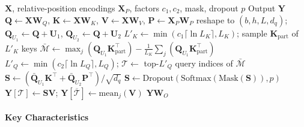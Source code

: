 \begin{algorithm}[H]
\caption{ProbSparse self-attention (training / parallel form)}
\begin{algorithmic}[1]
\Require $\mathbf{X}$, relative-position encodings $\mathbf{X}_P$, factors $c_1,c_2$, mask, dropout $p$
\Ensure Output $\mathbf{Y}$
\State $\mathbf{Q}\gets\mathbf{X}\mathbf{W}_Q$, $\mathbf{K}\gets\mathbf{X}\mathbf{W}_K$, $\mathbf{V}\gets\mathbf{X}\mathbf{W}_V$, $\mathbf{P}\gets\mathbf{X}_P\mathbf{W}_P$
\State reshape to $(b,h,L,d_q)$; $\mathbf{Q}_{U_1}\gets\mathbf{Q}+\mathbf{U}_1$, $\mathbf{Q}_{U_2}\gets\mathbf{Q}+\mathbf{U}_2$
\State $L'_K \gets \min(c_1\lceil\ln L_K\rceil, L_K)$; sample $\mathbf{K}_{\text{part}}$ of $L'_K$ keys 
\State $\bar{\mathcal{M}} \gets \max_j(\mathbf{Q}_{U_1}\mathbf{K}_{\text{part}}^{\top}) - \frac{1}{L_K}\sum_j(\mathbf{Q}_{U_1}\mathbf{K}_{\text{part}}^{\top})$ 
\State $L'_Q \gets \min(c_2\lceil\ln L_Q\rceil, L_Q)$; $\mathcal{T}\gets$ top-$L'_Q$ query indices of $\bar{\mathcal{M}}$
\State $\mathbf{S} \gets (\bar{\mathbf{Q}}_{U_1}\mathbf{K}^{\top} + \bar{\mathbf{Q}}_{U_2}\mathbf{P}^{\top})/\sqrt{d_q}$ 
\State $\mathbf{S} \gets \mathrm{Dropout}(\mathrm{Softmax}(\mathrm{Mask}(\mathbf{S})), p)$
\State $\mathbf{Y}[\mathcal{T}] \gets \mathbf{S}\mathbf{V}$; \quad $\mathbf{Y}[\overline{\mathcal{T}}] \gets \mathrm{mean}_j(\mathbf{V})$ 
\State \Return $\mathbf{Y}\mathbf{W}_O$
\end{algorithmic}
\end{algorithm}

\paragraph{Key Characteristics}


